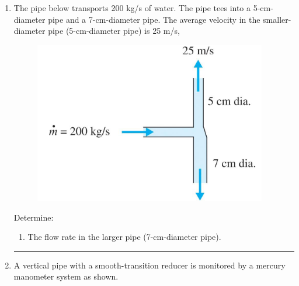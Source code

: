 \documentclass[12pt]{article}
\begin{document}
\begin{enumerate}
\item The pipe below transports 200 kg/s of water. The pipe tees into a 5-cm-diameter pipe and a
7-cm-diameter pipe. The average velocity in the smaller-diameter pipe (5-cm-diameter pipe) is 25 m/s,

\begin{figure}[htbp] %
   \centering
   \includegraphics[width=4in]{continunity.png} 
   \caption{}
   \label{fig:continunity}
\end{figure}

Determine:
\begin{enumerate}
\item The flow rate in the larger pipe (7-cm-diameter pipe).
\end{enumerate}
\noindent\rule{\linewidth}{0.4pt}
\clearpage
\item A vertical pipe with a smooth-transition reducer is monitored by a mercury manometer system as shown.


\end{enumerate}
\end{document}
